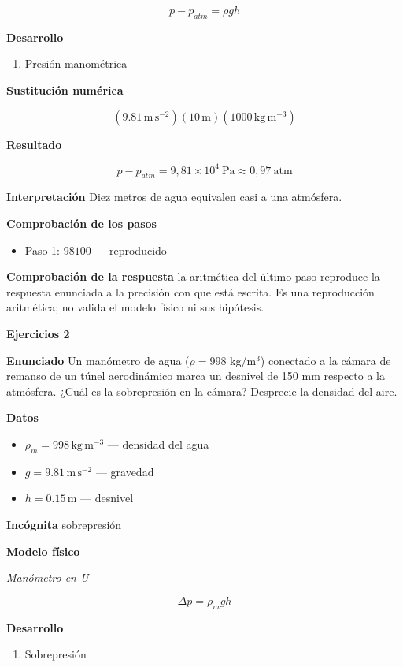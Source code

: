 \documentclass[10pt,openany]{book}
\begin{document}
\[
p - p_{atm} = \rho g h
\]

\noindent\textbf{Desarrollo}
\begin{enumerate}
\item
Presión manométrica
\end{enumerate}

\noindent\textbf{Sustitución numérica}

\[
\left(9.81\,\mathrm{m}\,\mathrm{s}^{-2}\right) \left(10\,\mathrm{m}\right) \left(1000\,\mathrm{kg}\,\mathrm{m}^{-3}\right)
\]

\noindent\textbf{Resultado}

\[
p - p_{atm} = 9{,}81\times 10^{4}\ \mathrm{Pa} \approx 0{,}97\ \mathrm{atm}
\]

\noindent\textbf{Interpretación}
Diez metros de agua equivalen casi a una atmósfera.

\noindent\textbf{Comprobación de los pasos}
\begin{itemize}
\item Paso 1: $98100$ — reproducido
\end{itemize}

\noindent\textbf{Comprobación de la respuesta} la aritmética del último paso reproduce la respuesta enunciada a la precisión con que está escrita. Es una reproducción aritmética; no valida el modelo físico ni sus hipótesis.

\noindent\textbf{Ejercicios 2}

\noindent\textbf{Enunciado}
Un manómetro de agua (\(\rho = 998\) kg/m\(^3\)) conectado a la cámara de remanso de un túnel aerodinámico marca un desnivel de 150 mm respecto a la atmósfera. ¿Cuál es la sobrepresión en la cámara? Desprecie la densidad del aire.

\noindent\textbf{Datos}
\begin{itemize}
\item $\rho_{m} = 998\,\mathrm{kg}\,\mathrm{m}^{-3}$ — densidad del agua
\item $g = 9.81\,\mathrm{m}\,\mathrm{s}^{-2}$ — gravedad
\item $h = 0.15\,\mathrm{m}$ — desnivel
\end{itemize}

\noindent\textbf{Incógnita}
sobrepresión

\noindent\textbf{Modelo físico}

\noindent\textit{Manómetro en U}

\[
\Delta p = \rho_m g h
\]

\noindent\textbf{Desarrollo}
\begin{enumerate}
\item
Sobrepresión
\end{enumerate}
\end{document}
